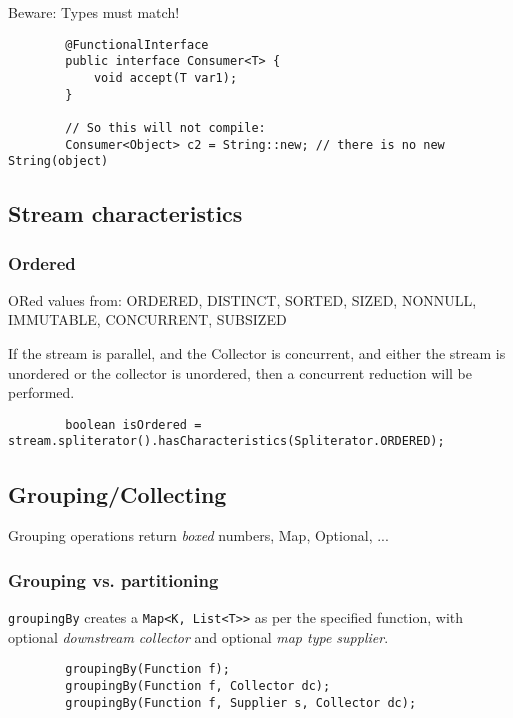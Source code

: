\documentclass{scrartcl}
\begin{document}
    Beware: Types must match!

    \begin{lstlisting}
        @FunctionalInterface
        public interface Consumer<T> {
            void accept(T var1);
        }

        // So this will not compile:
        Consumer<Object> c2 = String::new; // there is no new String(object)
    \end{lstlisting}

\subsection{Stream characteristics}
\subsubsection{Ordered}

    ORed values from: ORDERED, DISTINCT, SORTED, SIZED, NONNULL, IMMUTABLE, CONCURRENT, SUBSIZED

    If the stream is parallel, and the Collector is concurrent,
    and either the stream is unordered or the collector is unordered,
    then a concurrent reduction will be performed.

    \begin{lstlisting}
        boolean isOrdered = stream.spliterator().hasCharacteristics(Spliterator.ORDERED);
    \end{lstlisting}

\subsection{Grouping/Collecting}

    Grouping operations return \textit{boxed} numbers, Map, Optional, ...

\subsubsection{Grouping vs. partitioning}

    \lstinline{groupingBy} creates a \lstinline{Map<K, List<T>>} as per the specified function, with optional \textit{downstream collector} and optional \textit{map type supplier}.

    \begin{lstlisting}
        groupingBy(Function f);
        groupingBy(Function f, Collector dc);
        groupingBy(Function f, Supplier s, Collector dc);
    \end{lstlisting}
\end{document}
